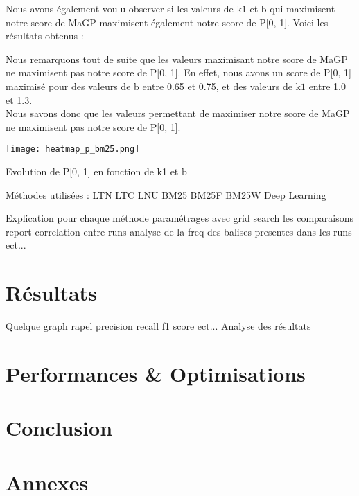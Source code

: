 \documentclass[a4paper, 12pt]{article}
\begin{document}
Nous avons également voulu observer si les valeurs de $\text{k1}$ et $\text{b}$ qui maximisent notre score de MaGP
maximisent également notre score de P[0, 1]. 
Voici les résultats obtenus :

\begin{table}[!h]
    \begin{minipage}{0.45\linewidth}
        Nous remarquons tout de suite que les valeurs maximisant notre score de MaGP ne maximisent pas notre score de P[0, 1].
        En effet, nous avons un score de P[0, 1] maximisé pour des valeurs de $\text{b}$ entre 0.65 et 0.75,
        et des valeurs de $\text{k1}$ entre 1.0 et 1.3. \\

        Nous savons donc que les valeurs permettant de maximiser notre score de MaGP ne maximisent pas notre score de P[0, 1].
    \end{minipage}
    \hspace{0.05\linewidth} %
    \begin{minipage}{0.55\linewidth}
        \centering
        \texttt{[image: heatmap\_p\_bm25.png]}
        \label{fig:enter-label}
        \caption{Evolution de P[0, 1] en fonction de k1 et b}
    \end{minipage}%
\end{table}

Méthodes utilisées :
LTN 
LTC
LNU
BM25
BM25F
BM25W
Deep Learning

Explication pour chaque méthode 
paramétrages avec grid search les comparaisons report
correlation entre runs
analyse de la freq des balises presentes dans les runs
ect...


\section{Résultats}
Quelque graph rapel precision recall f1 score ect...
Analyse des résultats

\section{Performances \& Optimisations}

\section{Conclusion}

\section{Annexes}
\end{document}
